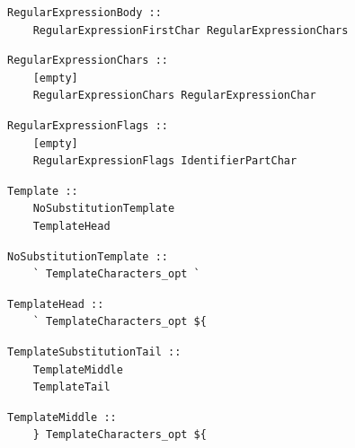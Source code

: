\noindent\textbf{\texttt{}}\par
\begin{lstlisting}
RegularExpressionBody ::
    RegularExpressionFirstChar RegularExpressionChars
\end{lstlisting}

\noindent\textbf{\texttt{}}\par
\begin{lstlisting}
RegularExpressionChars ::
    [empty]
    RegularExpressionChars RegularExpressionChar
\end{lstlisting}

\noindent\textbf{\texttt{}}\par
\begin{lstlisting}
RegularExpressionFlags ::
    [empty]
    RegularExpressionFlags IdentifierPartChar
\end{lstlisting}

\noindent\textbf{\texttt{}}\par
\begin{lstlisting}
Template ::
    NoSubstitutionTemplate
    TemplateHead
\end{lstlisting}

\noindent\textbf{\texttt{}}\par
\begin{lstlisting}
NoSubstitutionTemplate ::
    ` TemplateCharacters_opt `
\end{lstlisting}

\noindent\textbf{\texttt{}}\par
\begin{lstlisting}
TemplateHead ::
    ` TemplateCharacters_opt ${
\end{lstlisting}

\noindent\textbf{\texttt{}}\par
\begin{lstlisting}
TemplateSubstitutionTail ::
    TemplateMiddle
    TemplateTail
\end{lstlisting}

\noindent\textbf{\texttt{}}\par
\begin{lstlisting}
TemplateMiddle ::
    } TemplateCharacters_opt ${
\end{lstlisting}

